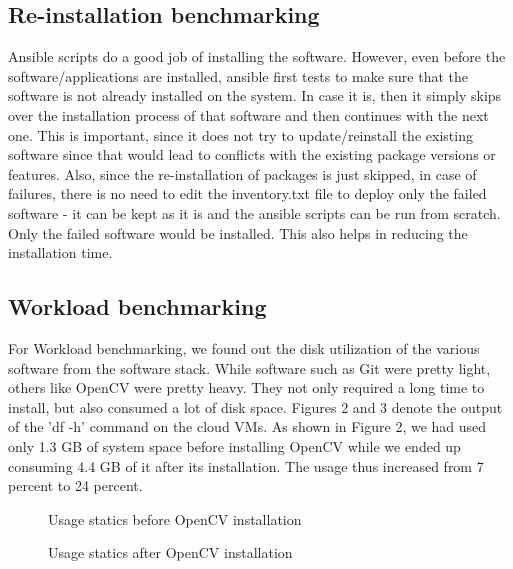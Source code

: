 \documentclass[9pt,twocolumn,twoside]{../../styles/osajnl}
\begin{document}
\subsection{Re-installation benchmarking}
Ansible scripts do a good job of installing the software.  However,
even before the software/applications are installed, ansible first
tests to make sure that the software is not already installed on the
system.  In case it is, then it simply skips over the installation
process of that software and then continues with the next one.  This
is important, since it does not try to update/reinstall the existing
software since that would lead to conflicts with the existing package
versions or features.  Also, since the re-installation of packages is
just skipped, in case of failures, there is no need to edit the
inventory.txt file to deploy only the failed software - it can be kept
as it is and the ansible scripts can be run from scratch.  Only the
failed software would be installed.  This also helps in reducing the
installation time.

\subsection{Workload benchmarking}
For Workload benchmarking, we found out the disk utilization of the
various software from the software stack.  While software such as
Git were pretty light, others like OpenCV were pretty heavy.  They not
only required a long time to install, but also consumed a lot of disk
space.  Figures 2 and 3 denote the output of the 'df -h' command on
the cloud VMs.  As shown in Figure 2, we had used only 1.3 GB of
system space before installing OpenCV while we ended up consuming 4.4
GB of it after its installation.  The usage thus increased from 7
percent to 24 percent.

\begin{figure}[htbp]
  \centering
  \caption{Usage statics before OpenCV installation}
\end{figure}

\begin{figure}[htbp]
  \centering
  \caption{Usage statics after OpenCV installation}
\end{figure}
\end{document}
